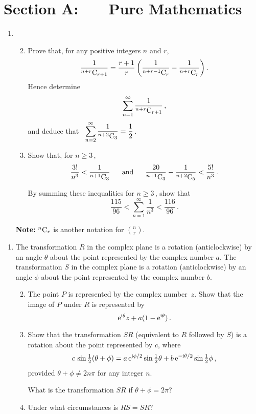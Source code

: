 \documentclass[a4, 11pt]{report}
\newlength{\qspace}
\newcounter{qnumber}
\newenvironment{question}%
 {\vspace{\qspace}
  \begin{enumerate}[\bfseries 1\quad][10]%
    \setcounter{enumi}{\value{qnumber}}%
    \item%
 }
{
  \end{enumerate}
  \filbreak
  \stepcounter{qnumber}
 }
\newenvironment{questionparts}[1][1]%
 {
  \begin{enumerate}[\bfseries (i)]%
    \setcounter{enumii}{#1}
    \addtocounter{enumii}{-1}
    \setlength{\itemsep}{5mm}
    \setlength{\parskip}{3pt}
 }
 {
  \end{enumerate}
 }
\def\e{{\rm e}}
\def\C{{\rm C}}
\def\ge{\geqslant}
\begin{document}
\setcounter{page}{2}

 
\section*{Section A: \ \ \ Pure Mathematics}


\begin{question}
\begin{questionparts}
\item
Prove that, for any positive integers $n$ and $r$,
\[
\frac{1}{^{n+r}\C_{r+1}}
=\frac{r+1}{r} \left(\frac{1}{^{n+r-1}\C_{r}}-\frac{1}{^{n+r}\C_{r}}\right).
\]
Hence determine
\[
\sum_{n=1}^{\infty}{\frac{1}{^{n+r}\C_{r+1}}} 
\,,
\]
and deduce that \  
$\displaystyle \sum_{n=2}^\infty \frac 1 {^{n+2}\C_3} = \frac12\,$.
\item Show that, 
for $n \ge 3\,$, 
\[
\frac{3!}{n^3}  <  \frac{1}{^{n+1}\C_{3}}
\ \ \ \ \ 
\text{and}
\ \ \ \ \ 
\frac{20}{^{n+1}\C_3} - \frac{1}{^{n+2}\C_{5}}
< \frac{5!}{n^3} 
\,.
\]



By summing these inequalities for $n \ge 3\,$, show that
\[
\frac{115}{96} < \sum_{n=1}^{\infty}{\frac{1}{n^3}} <
 \frac{116}{96} \, .
\]
\end{questionparts}
{\bf Note: } $^n\C_r$ is another notation for $\displaystyle \binom n r $.


\end{question}

\begin{question}
The transformation $R$ in the complex plane is a rotation (anticlockwise) 
by an angle $\theta$ 
about the point represented by the complex number $a$.
The transformation $S$ in the complex plane is a rotation 
(anticlockwise)
by an angle $\phi$ 
about the point represented by the complex number $b$.

\begin{questionparts}
\item
The point $P$ is represented by the complex number~$z$.
Show that the image of $P$ under $R$ is represented by 
\[
\e^{{\mathrm i} \theta}z  + a(1-\e^{{\rm i} \theta})\,.
\]


\item Show that 
the transformation $SR$ (equivalent to $R$ followed by $S$)
is a rotation about the point represented by
$c$, where
\[ 
c\,\sin
 \tfrac12 (\theta+\phi)
= a\,\e^{ {\mathrm i}\phi/2}\sin  \tfrac12\theta
+  b\,\e^{-{\mathrm i} \theta/2}\sin  \tfrac12 \phi 
\,,
\]
provided $\theta+\phi \ne 2n\pi$ for any integer $n$.


What is the transformation $SR$ if $\theta +\phi = 2\pi$?
\item
Under what circumstances is $RS =SR$?
\end{questionparts}

\end{question}
\end{document}
